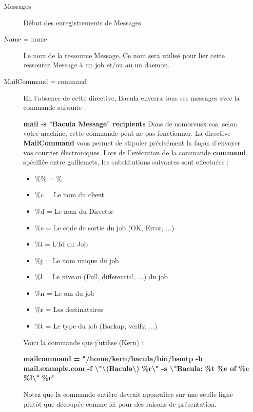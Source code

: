 \begin{description}

\item [Messages]
   D\'ebut des enregistrements de Messages

\item [Name = \lt{}name\gt{}]
   Le nom de la ressource Message. Ce nom sera utilis\'e pour lier cette ressource 
Message \`a un job et/ou au un daemon.

\label{mailcommand}

\item [MailCommand = \lt{}command\gt{}]
En l'absence de cette directive, Bacula enverra tous ses messages avec la 
commande suivante :

{\bf mail -s "Bacula Message" \lt{}recipients\gt{}}  
Dans de nombreusx cas, selon votre machine, cette commande peut ne pas fonctionner. 
La directive  {\bf MailCommand} vous permet de stipuler pr\'ecis\'ement la fa\c{c}on 
d'envoyer vos courrier \'electroniques. Lors de l'ex\'ecution de la commande 
{\bf command}, sp\'ecifi\'ee entre guillemets, les substitutions suivantes sont 
effectu\'ees :

\begin{itemize}
  \item \%\% = \%  
  \item \%c = Le nom du client
  \item \%d = Le nom du Director  
  \item \%e = Le code de sortie du job (OK, Error, ...)  
  \item \%i = L'Id du Job  
  \item \%j = Le nom unique du job  
  \item \%l = Le niveau (Full, differential, ...) du job  
  \item \%n = Le om du job  
  \item \%r = Les destinataires  
  \item \%t = Le type du job (Backup, verify, ...)  
\end{itemize}

Voici la commande que j'utilise (Kern) :

{\bf mailcommand = "/home/kern/bacula/bin/bsmtp -h mail.example.com -f
\textbackslash{}"\textbackslash{}(Bacula\textbackslash{})
\%r\textbackslash{}" -s \textbackslash{}"Bacula: \%t \%e of \%c
\%l\textbackslash{}" \%r"}

Notez que la commande enti\`ere devrait appara\^itre sur une seulle ligne plut\^ot 
que d\'ecoup\'ee comme ici pour des raisons de pr\'esentation.


\end{description}
